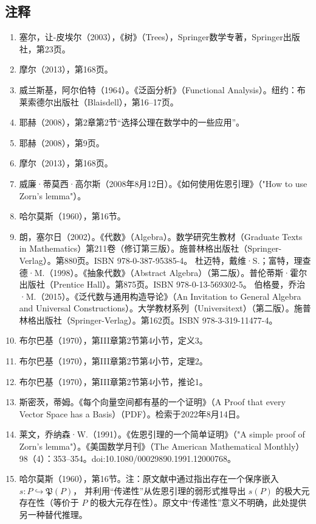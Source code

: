 \subsection{注释}
\begin{enumerate}
\item 塞尔，让-皮埃尔（2003），《树》（Trees），Springer数学专著，Springer出版社，第23页。
\item 摩尔（2013），第168页。
\item 威兰斯基，阿尔伯特（1964）。《泛函分析》（Functional Analysis）。纽约：布莱索德尔出版社（Blaisdell），第16–17页。
\item 耶赫（2008），第2章第2节“选择公理在数学中的一些应用”。
\item 耶赫（2008），第9页。
\item 摩尔（2013），第168页。
\item 威廉·蒂莫西·高尔斯（2008年8月12日）。《如何使用佐恩引理》（"How to use Zorn's lemma"）。
\item 哈尔莫斯（1960），第16节。
\item 朗，塞尔日（2002）。《代数》（Algebra）。数学研究生教材（Graduate Texts in Mathematics）第211卷（修订第三版）。施普林格出版社（Springer-Verlag）。第880页。ISBN 978-0-387-95385-4。
杜迈特，戴维·S.；富特，理查德·M.（1998）。《抽象代数》（Abstract Algebra）（第二版）。普伦蒂斯·霍尔出版社（Prentice Hall）。第875页。ISBN 978-0-13-569302-5。
伯格曼，乔治·M.（2015）。《泛代数与通用构造导论》（An Invitation to General Algebra and Universal Constructions）。大学教材系列（Universitext）（第二版）。施普林格出版社（Springer-Verlag）。第162页。ISBN 978-3-319-11477-4。
\item 布尔巴基（1970），第III章第2节第4小节，定义3。
\item 布尔巴基（1970），第III章第2节第4小节，定理2。
\item 布尔巴基（1970），第III章第2节第4小节，推论1。
\item 斯密茨，蒂姆。《每个向量空间都有基的一个证明》（A Proof that every Vector Space has a Basis）（PDF）。检索于2022年8月14日。
\item 莱文，乔纳森·W.（1991）。《佐恩引理的一个简单证明》（"A simple proof of Zorn's lemma"）。《美国数学月刊》（The American Mathematical Monthly）98（4）：353–354。doi:10.1080/00029890.1991.12000768。
\item 哈尔莫斯（1960），第16节。注：原文献中通过指出存在一个保序嵌入
\( s: P \hookrightarrow \mathfrak{P}(P) \)，
并利用“传递性”从佐恩引理的弱形式推导出 \( s(P) \) 的极大元存在性（等价于 \( P \) 的极大元存在性）。原文中“传递性”意义不明确，此处提供另一种替代推理。

\end{enumerate}
